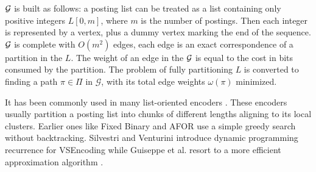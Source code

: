 \documentclass{sig-alternate-05-2015}
\begin{document}
$ \cal G $ is built as follows: a posting list can be treated as a list containing only positive integers $ L[0, m] $, where $ m $ is the number of postings.
Then each integer is represented by a vertex, plus a dummy vertex marking the end of the sequence.
$ \cal G $ is complete with $ O(m^2) $ edges, each edge is an exact correspondence of a partition in the $ L $.
The weight of an edge in the $ \cal G $ is equal to the cost in bits consumed by the partition.
The problem of fully partitioning $ L $ is converted to finding a path $\pi \in \Pi $ in $\mathcal{G}$, with its total edge weights $ \omega(\pi) $ minimized.

It has been commonly used in many list-oriented encoders \cite{song2016optimizing}.
These encoders usually partition a posting list into chunks of different lengths aligning to its local clusters.
Earlier ones like Fixed Binary \cite{anh2004index} and AFOR use a simple greedy search without backtracking.
Silvestri and Venturini introduce dynamic programming recurrence for VSEncoding \cite{silvestri2010vsencoding} while Guiseppe et al. resort to a more efficient approximation algorithm \cite{ottaviano2014partitioned}.
\end{document}
